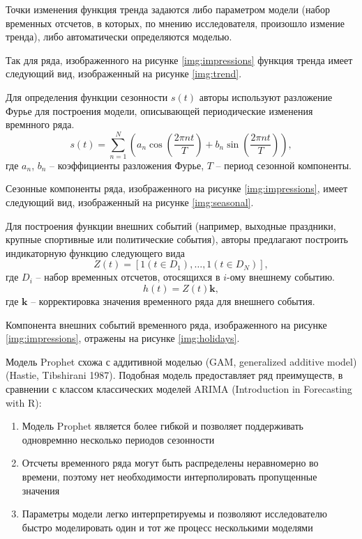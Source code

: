 Точки изменения функция тренда задаются либо параметром модели (набор временных отсчетов, в которых, по мнению
исследователя, произошло измение тренда), либо автоматически определяются моделью. 


Так для ряда, изображенного на рисунке \eqref{img:impressions} функция тренда имеет следующий вид, изображенный
на рисунке \eqref{img:trend}.


Для определения функции сезонности $s(t)$ авторы используют разложение Фурье для построения модели, описывающей
периодические изменения времнного ряда.
\begin{equation}
    s(t) = \sum \limits_{n=1}^N \left( a_n \cos{\left( \dfrac{2\pi n t}{T} \right)} + b_n \sin{\left( \dfrac{2\pi n t}{T} \right)} \right),
\end{equation}
где $a_n$, $b_n$ -- коэффициенты разложения Фурье, $T$ -- период сезонной компоненты.

Сезонные компоненты ряда, изображенного на рисунке \eqref{img:impressions}, имеет следующий вид, изображенный
на рисунке \eqref{img:seasonal}.


Для построения функции внешних событий (например, выходные праздники, крупные спортивные или политические события),
авторы предлагают построить индикаторную функцию следующего вида
\begin{equation}
    Z(t) = \left[ 1 (t \in D_1), \dots, 1 (t \in D_N)\right],
\end{equation}
где $D_i$ -- набор временных отсчетов, отосящихся в $i$-ому внешнему событию.
\begin{equation}
    h(t) = Z(t)\mathbf{k},
\end{equation}
где $\mathbf{k}$ -- корректировка значения временного ряда для внешнего события.

Компонента внешних событий временного ряда, изображенного на рисунке \eqref{img:impressions}, отражены на рисунке 
\eqref{img:holidays}.


Модель Prophet схожа с аддитивной моделью (GAM, generalized additive model) (Hastie, Tibshirani 1987). Подобная модель
предоставляет ряд преимуществ, в сравнении с классом классических моделей ARIMA
(Introduction in Forecasting with R):
\begin{enumerate}
    \item Модель Prophet является более гибкой и позволяет поддерживать одновремнно несколько периодов сезонности
    \item Отсчеты временного ряда могут быть распределены неравномерно во времени, поэтому нет необходимости
    интерполировать пропущенные значения
    \item Параметры модели легко интерпретируемы и позволяют исследователю быстро моделировать один и тот же процесс
    несколькими моделями
\end{enumerate}
